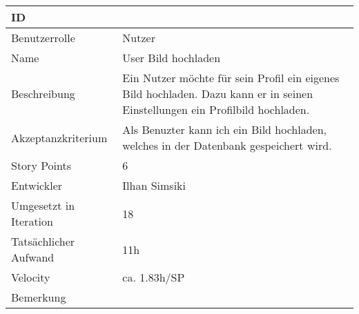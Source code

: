 \begin{tabularx}{\textwidth}{|p{}|X|}
	\hline
	ID & \\
	\hline
	Benutzerrolle & Nutzer\\
	\hline
	Name & User Bild hochladen\\
	\hline
	Beschreibung & Ein Nutzer möchte für sein Profil ein eigenes Bild hochladen. Dazu kann er in seinen Einstellungen ein Profilbild hochladen.\\
	\hline
	Akzeptanzkriterium & Als Benuzter kann ich ein Bild hochladen, welches in der Datenbank gespeichert wird.\\
	\hline
	Story Points & 6\\
	\hline
	Entwickler & Ilhan Simsiki\\
	\hline
	Umgesetzt in Iteration & 18\\
	\hline
	Tatsächlicher Aufwand & 11h\\
	\hline
	Velocity & ca. 1.83h/SP\\
	\hline
	Bemerkung & \\
	\hline
\end{tabularx}
\vspace{20pt}
